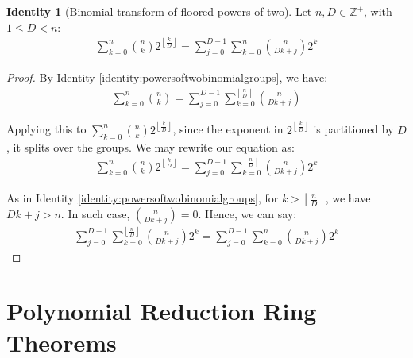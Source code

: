 \documentclass{article}
\theoremstyle{plain}
\theoremstyle{definition}
\newtheorem{identity}{Identity}
\newcommand{\floor}[1]{\left\lfloor #1 \right\rfloor}
\newcommand{\Z}{\mathbb{Z}}
\begin{document}
\begin{identity}[Binomial transform of floored powers of two] \label{identity:flooredpowersoftwobinomialgroups}
Let $n, D \in \Z^+$, with $1 \leq D < n$:
\begin{align}
    \sum_{k=0}^{n} \binom{n}{k} 2^{\floor{\frac{k}{D}}} = \sum_{j=0}^{D-1} \sum_{k=0}^{n} \binom{n}{D k + j} 2^{k}
\end{align}
\end{identity}
\begin{proof}
    By Identity \ref{identity:powersoftwobinomialgroups}, we have:
    \begin{align}
        \sum_{k=0}^{n} \binom{n}{k} = \sum_{j=0}^{D-1} \sum_{k=0}^{\floor{\frac{n}{D}}} \binom{n}{D k + j}
    \end{align}

    Applying this to $\sum_{k=0}^{n} \binom{n}{k} 2^{\floor{\frac{k}{D}}}$, since the exponent in $2^{\floor{\frac{k}{D}}}$ is partitioned by $D$, it splits over the groups. We may rewrite our equation as:
    \begin{align}
        \sum_{k=0}^{n} \binom{n}{k} 2^{\floor{\frac{k}{D}}} = \sum_{j=0}^{D-1} \sum_{k=0}^{\floor{\frac{n}{D}}} \binom{n}{D k + j} 2^{k}
    \end{align}

    As in Identity \ref{identity:powersoftwobinomialgroups}, for $k > \floor{\frac{n}{D}}$, we have $D k + j > n$. In such case, $\binom{n}{D k + j} = 0$. Hence, we can say:
    \begin{align}
        \sum_{j=0}^{D-1} \sum_{k=0}^{\floor{\frac{n}{D}}} \binom{n}{D k + j} 2^{k} = \sum_{j=0}^{D-1} \sum_{k=0}^{n} \binom{n}{D k + j} 2^{k}
    \end{align}
\end{proof}

\section{Polynomial Reduction Ring Theorems}
\end{document}
